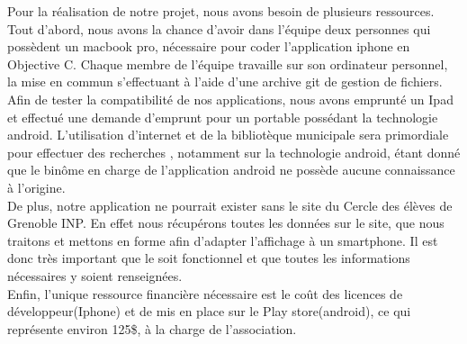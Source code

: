 \documentclass[a4paper,11px]{article}
\begin{document}
Pour la réalisation de notre projet, nous avons besoin de plusieurs ressources. Tout d'abord, nous avons la chance d'avoir dans l'équipe deux personnes qui possèdent un macbook pro, nécessaire pour coder l'application iphone en Objective C. Chaque membre de l'équipe travaille sur son ordinateur personnel, la mise en commun s'effectuant à l'aide d'une archive git de gestion de fichiers. Afin de tester la compatibilité de nos applications, nous avons emprunté un Ipad et effectué une demande d'emprunt pour un portable possédant la technologie android. L'utilisation d'internet et de la bibliotèque municipale sera primordiale pour effectuer des recherches , notamment sur la technologie android, étant donné que le binôme en charge de l'application android ne possède aucune connaissance à l'origine.\\
De plus, notre application ne pourrait exister sans le site du Cercle des élèves de Grenoble INP. En effet nous récupérons toutes les données sur le site, que nous traitons et mettons  en forme afin d'adapter l'affichage à un smartphone. Il est donc très important que le soit fonctionnel et que toutes les informations nécessaires y soient renseignées.\\ 
Enfin, l'unique ressource financière nécessaire est le coût des licences de développeur(Iphone) et de mis en place sur le Play store(android), ce qui représente environ 125\$, à la charge de l'association. 
\end{document}
